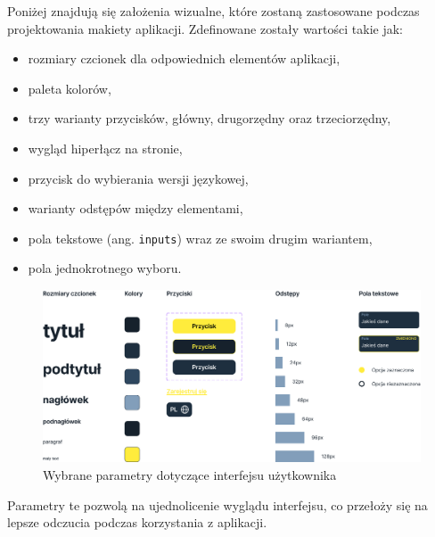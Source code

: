 Poniżej znajdują się założenia wizualne, które zostaną zastosowane podczas projektowania makiety aplikacji. Zdefinowane zostały wartości takie jak:
\begin{itemize}
    \item rozmiary czcionek dla odpowiednich elementów aplikacji,
    \item paleta kolorów,
    \item trzy warianty przycisków, główny, drugorzędny oraz trzeciorzędny,
    \item wygląd hiperłącz na stronie,
    \item przycisk do wybierania wersji językowej,
    \item warianty odstępów między elementami,
    \item pola tekstowe (ang. \texttt{inputs}) wraz ze swoim drugim wariantem,
    \item pola jednokrotnego wyboru.
\end{itemize}
\begin{figure}[H]
	\centering
		\includegraphics[width=1\linewidth]{rozdzial1/komponenty.png}
	\caption{Wybrane parametry dotyczące interfejsu użytkownika}
	\label{Rys. fig:Wybrane parametry dotyczące interfejsu użytkownika}
\end{figure}
Parametry te pozwolą na ujednolicenie wyglądu interfejsu, co przełoży się na lepsze odczucia podczas korzystania z aplikacji.

